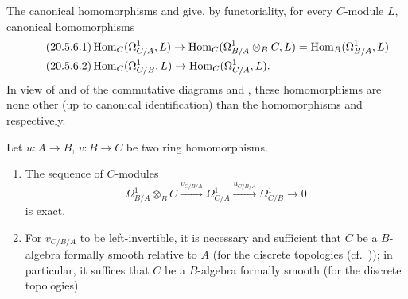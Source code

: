 \begin{env}[20.5.6]
\label{0.20.5.6}
The canonical homomorphisms  and  give, by functoriality, for every $C$-module $L$, canonical homomorphisms
\begin{align}
\tag{20.5.6.1}
  \label{0.20.5.6.1}
  &\operatorname{Hom}_C(\Omega^1_{C/A},L)\to\operatorname{Hom}_C(\Omega^1_{B/A}\otimes_B C,L)=\operatorname{Hom}_B(\Omega^1_{B/A},L) \\
\tag{20.5.6.2}
  \label{0.20.5.6.2}
  &\operatorname{Hom}_C(\Omega^1_{C/B},L)\to\operatorname{Hom}_C(\Omega^1_{C/A},L).
\end{align}
In view of  and of the commutative diagrams  and , these homomorphisms are none other (up to canonical identification) than the homomorphisms  and  respectively.
\end{env}

\begin{theorem}[20.5.7]
\label{0.20.5.7}
Let $u:A\to B$, $v:B\to C$ be two ring homomorphisms.
\begin{enumerate}
  \item[\rm(i)] The sequence of $C$-modules
\begin{equation}
\tag{20.5.7.1}
  \label{0.20.5.7.1}
  \Omega^1_{B/A}\otimes_B C\xrightarrow{v_{C/B/A}}\Omega^1_{C/A}\xrightarrow{u_{C/B/A}}\Omega^1_{C/B}\to 0
\end{equation}
is exact.
  \item[\rm(ii)] For $v_{C/B/A}$ to be left-invertible, it is necessary and sufficient that $C$ be a $B$-algebra formally smooth relative to $A$ \textup{(}for the discrete topologies \textup{(}cf.\ \textup{))}; in particular, it suffices that $C$ be a $B$-algebra formally smooth \textup{(}for the discrete topologies\textup{)}.
\end{enumerate}
\end{theorem}

